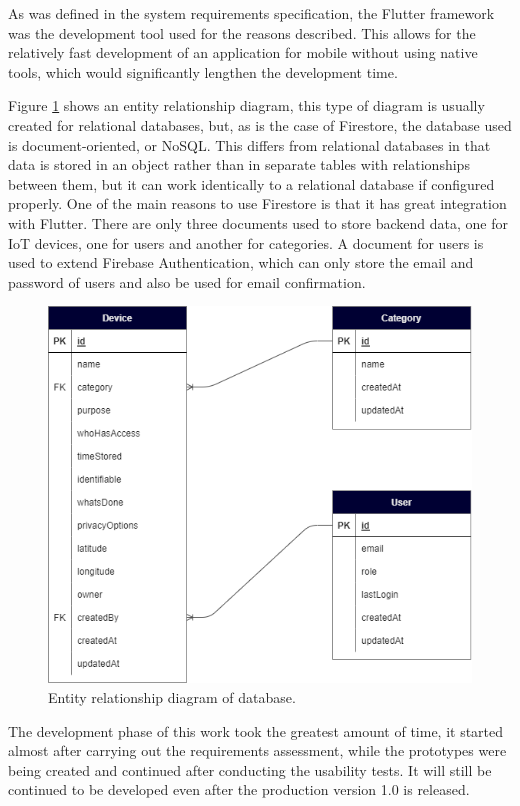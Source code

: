 As was defined in the system requirements specification, the Flutter
framework was the development tool used for the reasons described.
This allows for the relatively fast development of an application for
mobile without using native tools, which would significantly lengthen the
development time.

Figure \ref{fig:dbmodel} shows an entity relationship diagram, this type of
diagram is usually created for relational databases, but, as is the case of
Firestore, the database used is document-oriented, or NoSQL. This differs from
relational databases in that data is stored in an object rather than in separate
tables with relationships between them, but it can work identically to a relational
database if configured properly. One of the main reasons to use Firestore is that
it has great integration with Flutter. There are only three documents used to
store backend data, one for IoT devices, one for users and another for categories.
A document for users is used to extend Firebase Authentication, which can only
store the email and password of users and also be used for email confirmation.

\begin{figure}[H]
    \centering
    \includegraphics[width=340pt]{../assets/images/erdiagram.png}
    \caption{Entity relationship diagram of database.}
    \label{fig:dbmodel}
\end{figure}

The development phase of this work took the greatest amount of time,
it started almost after carrying out the requirements assessment, while
the prototypes were being created and continued after conducting the
usability tests. It will still be continued to be developed even after
the production version 1.0 is released.

